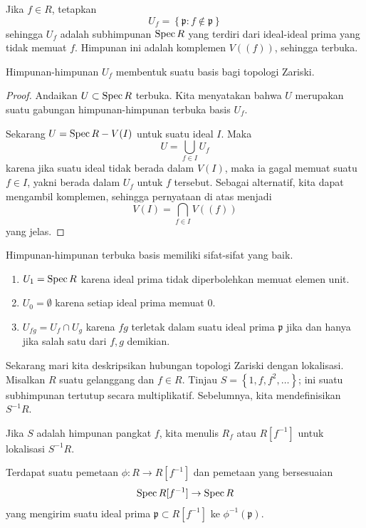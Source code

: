 \begin{definition} 
Jika $f \in R$, tetapkan 
\[ U_f = \left\{\mathfrak{p}: f \notin \mathfrak{p}\right\}  \]
sehingga $U_f$ adalah subhimpunan $\operatorname{Spec} R$ yang terdiri dari ideal-ideal prima
yang tidak memuat
$f$. Himpunan ini adalah komplemen $V((f))$, sehingga terbuka.  
\end{definition} 

\begin{proposition} 
Himpunan-himpunan $U_f$ membentuk suatu basis bagi topologi Zariski. 
\end{proposition} 

\begin{proof} 
Andaikan $U \subset \operatorname{Spec} R$ terbuka. Kita menyatakan bahwa $U$ merupakan suatu
gabungan himpunan-himpunan
terbuka basis $U_f$. 

Sekarang $U = \operatorname{Spec} R - V(I)$ untuk suatu ideal $I$. Maka
\[ U = \bigcup_{f \in I} U_f  \]
karena jika suatu ideal tidak berada dalam $V(I)$, maka ia gagal memuat
suatu $f \in I$,
yakni berada dalam $U_f$ untuk $f$ tersebut. Sebagai alternatif, kita dapat mengambil
komplemen, sehingga
pernyataan di atas menjadi
\[ V(I) = \bigcap_{f \in I} V((f))  \]
yang jelas.
\end{proof} 

Himpunan-himpunan terbuka basis memiliki sifat-sifat yang baik.
\begin{enumerate}
\item $U_1 = \operatorname{Spec} R$ karena ideal prima tidak diperbolehkan memuat
elemen
unit. 
\item $U_0 = \emptyset$ karena setiap ideal prima memuat $0$.
\item $U_{fg} = U_f \cap U_g$ karena $fg$ terletak dalam suatu ideal prima
$\mathfrak{p}$ jika dan hanya jika salah satu dari $f,g$ demikian.
\end{enumerate}

Sekarang mari kita deskripsikan hubungan topologi Zariski dengan
lokalisasi.
Misalkan $R$ suatu gelanggang dan $f \in R$. Tinjau $S = \left\{1, f, f^2,
\dots
\right\}$; ini suatu subhimpunan tertutup secara multiplikatif. Sebelumnya,
kita mendefinisikan
$S^{-1}R$.

\begin{definition} 
Jika $S$ adalah himpunan pangkat $f$, kita menulis $R_f$ atau $R[f^{-1}]$ untuk
lokalisasi $S^{-1}R$. 
\end{definition} 

Terdapat suatu pemetaan $\phi: R \to R[f^{-1}]$ dan pemetaan yang bersesuaian
\[ \operatorname{Spec} R[f^{-1}] \to \operatorname{Spec} R  \]
yang mengirim suatu ideal prima $\mathfrak{p} \subset R[f^{-1}]$ ke
$\phi^{-1}(\mathfrak{p})$.

